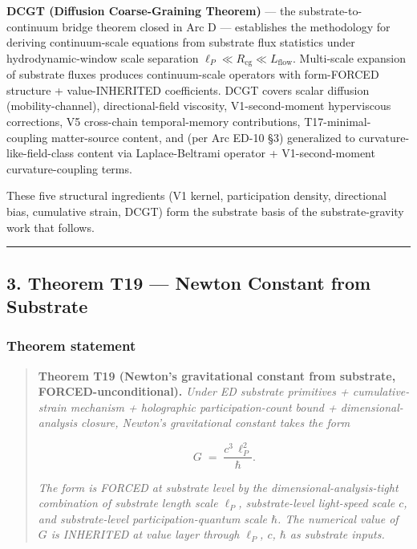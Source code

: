 \documentclass[
]{article}
\begin{document}
\textbf{DCGT (Diffusion Coarse-Graining Theorem)} --- the
substrate-to-continuum bridge theorem closed in Arc D --- establishes
the methodology for deriving continuum-scale equations from substrate
flux statistics under hydrodynamic-window scale separation
\(\ell_P \ll R_\mathrm{cg} \ll L_\mathrm{flow}\). Multi-scale expansion
of substrate fluxes produces continuum-scale operators with form-FORCED
structure + value-INHERITED coefficients. DCGT covers scalar diffusion
(mobility-channel), directional-field viscosity, V1-second-moment
hyperviscous corrections, V5 cross-chain temporal-memory contributions,
T17-minimal-coupling matter-source content, and (per Arc ED-10 §3)
generalized to curvature-like-field-class content via Laplace-Beltrami
operator + V1-second-moment curvature-coupling terms.

These five structural ingredients (V1 kernel, participation density,
directional bias, cumulative strain, DCGT) form the substrate basis of
the substrate-gravity work that follows.

\begin{center}\rule{0.5\linewidth}{0.5pt}\end{center}

\subsection{3. Theorem T19 --- Newton Constant from
Substrate}\label{theorem-t19-newton-constant-from-substrate}

\subsubsection{Theorem statement}\label{theorem-statement}

\begin{quote}
\textbf{Theorem T19 (Newton's gravitational constant from substrate,
FORCED-unconditional).} \emph{Under ED substrate primitives +
cumulative-strain mechanism + holographic participation-count bound +
dimensional-analysis closure, Newton's gravitational constant takes the
form}

\[G \;=\; \frac{c^3\,\ell_P^2}{\hbar}.\]

\emph{The form is FORCED at substrate level by the
dimensional-analysis-tight combination of substrate length scale
\(\ell_P\), substrate-level light-speed scale \(c\), and substrate-level
participation-quantum scale \(\hbar\). The numerical value of \(G\) is
INHERITED at value layer through \(\ell_P\), \(c\), \(\hbar\) as
substrate inputs.}
\end{quote}
\end{document}
